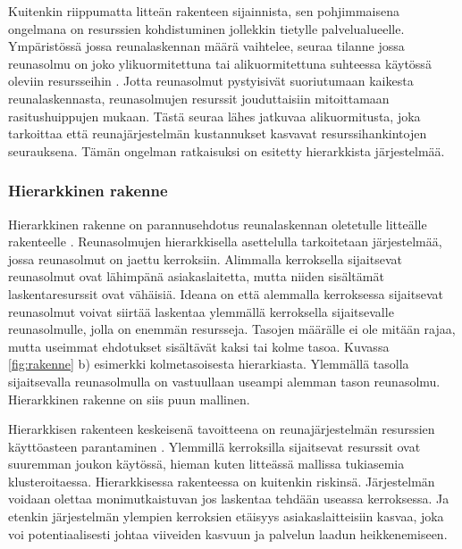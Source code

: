 Kuitenkin riippumatta litteän rakenteen sijainnista, sen pohjimmaisena ongelmana on resurssien kohdistuminen jollekkin tietylle palvelualueelle. Ympäristössä jossa reunalaskennan määrä vaihtelee, seuraa tilanne jossa reunasolmu on joko ylikuormitettuna tai alikuormitettuna suhteessa käytössä oleviin resursseihin \cite{tong2016hierarchical}. Jotta reunasolmut pystyisivät suoriutumaan kaikesta reunalaskennasta, reunasolmujen resurssit jouduttaisiin mitoittamaan rasitushuippujen mukaan. Tästä seuraa lähes jatkuvaa alikuormitusta, joka tarkoittaa että reunajärjestelmän kustannukset kasvavat resurssihankintojen seurauksena. 
Tämän ongelman ratkaisuksi on esitetty hierarkkista järjestelmää.




\subsubsection{Hierarkkinen rakenne}
Hierarkkinen rakenne on parannusehdotus reunalaskennan oletetulle litteälle rakenteelle \cite{tong2016hierarchical}.
Reunasolmujen hierarkkisella asettelulla tarkoitetaan järjestelmää, jossa reunasolmut on jaettu kerroksiin. Alimmalla kerroksella sijaitsevat reunasolmut ovat lähimpänä asiakaslaitetta, mutta niiden sisältämät laskentaresurssit ovat vähäisiä. 
Ideana on että alemmalla kerroksessa sijaitsevat reunasolmut voivat siirtää laskentaa ylemmällä kerroksella sijaitsevalle reunasolmulle, jolla on enemmän resursseja. Tasojen määrälle ei ole mitään rajaa, mutta useimmat ehdotukset sisältävät kaksi tai kolme tasoa. Kuvassa \ref{fig:rakenne} b) esimerkki kolmetasoisesta hierarkiasta.
Ylemmällä tasolla sijaitsevalla reunasolmulla on vastuullaan useampi alemman tason reunasolmu. Hierarkkinen rakenne on siis puun mallinen.

Hierarkkisen rakenteen keskeisenä tavoitteena on reunajärjestelmän resurssien käyttöasteen parantaminen \cite{tong2016hierarchical}. Ylemmillä kerroksilla sijaitsevat resurssit ovat suuremman joukon käytössä, hieman kuten litteässä mallissa tukiasemia klusteroitaessa. 
Hierarkkisessa rakenteessa on kuitenkin riskinsä. Järjestelmän voidaan olettaa monimutkaistuvan jos laskentaa tehdään useassa kerroksessa. Ja etenkin järjestelmän ylempien kerroksien etäisyys asiakaslaitteisiin kasvaa, joka voi potentiaalisesti johtaa viiveiden kasvuun ja palvelun laadun heikkenemiseen.

